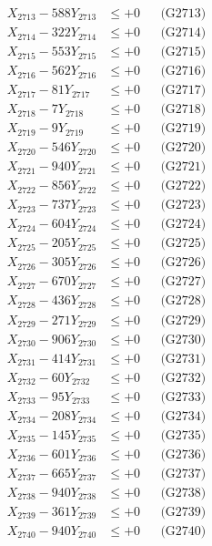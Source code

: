 \documentclass[a4paper,10pt]{article}
\begin{document}
{\begin{align}
X_{2713} - 588Y_{2713} &\leq +0 && \text{(G2713)} \\
X_{2714} - 322Y_{2714} &\leq +0 && \text{(G2714)} \\
X_{2715} - 553Y_{2715} &\leq +0 && \text{(G2715)} \\
X_{2716} - 562Y_{2716} &\leq +0 && \text{(G2716)} \\
X_{2717} - 81Y_{2717} &\leq +0 && \text{(G2717)} \\
X_{2718} - 7Y_{2718} &\leq +0 && \text{(G2718)} \\
X_{2719} - 9Y_{2719} &\leq +0 && \text{(G2719)} \\
X_{2720} - 546Y_{2720} &\leq +0 && \text{(G2720)} \\
\allowbreak
X_{2721} - 940Y_{2721} &\leq +0 && \text{(G2721)} \\
X_{2722} - 856Y_{2722} &\leq +0 && \text{(G2722)} \\
X_{2723} - 737Y_{2723} &\leq +0 && \text{(G2723)} \\
X_{2724} - 604Y_{2724} &\leq +0 && \text{(G2724)} \\
X_{2725} - 205Y_{2725} &\leq +0 && \text{(G2725)} \\
X_{2726} - 305Y_{2726} &\leq +0 && \text{(G2726)} \\
X_{2727} - 670Y_{2727} &\leq +0 && \text{(G2727)} \\
X_{2728} - 436Y_{2728} &\leq +0 && \text{(G2728)} \\
X_{2729} - 271Y_{2729} &\leq +0 && \text{(G2729)} \\
X_{2730} - 906Y_{2730} &\leq +0 && \text{(G2730)} \\
\allowbreak
X_{2731} - 414Y_{2731} &\leq +0 && \text{(G2731)} \\
X_{2732} - 60Y_{2732} &\leq +0 && \text{(G2732)} \\
X_{2733} - 95Y_{2733} &\leq +0 && \text{(G2733)} \\
X_{2734} - 208Y_{2734} &\leq +0 && \text{(G2734)} \\
X_{2735} - 145Y_{2735} &\leq +0 && \text{(G2735)} \\
X_{2736} - 601Y_{2736} &\leq +0 && \text{(G2736)} \\
X_{2737} - 665Y_{2737} &\leq +0 && \text{(G2737)} \\
X_{2738} - 940Y_{2738} &\leq +0 && \text{(G2738)} \\
X_{2739} - 361Y_{2739} &\leq +0 && \text{(G2739)} \\
X_{2740} - 940Y_{2740} &\leq +0 && \text{(G2740)} \\

\end{align}}
\end{document}
